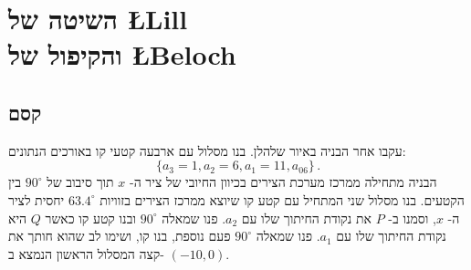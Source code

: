 

\chapter[השיטה של
\L{Lill}
והקיפול של
\L{Beloch}]%
{השיטה של
\L{Lill}\\
והקיפול של
\L{Beloch}%
}\label{c.origami-cube}

\section{קסם}\label{s.magic}

עקבו אחר הבניה באיור שלהלן.
בנו מסלול עם ארבעה קטעי קו באורכים הנתונים:
\[
\{a_3=1,a_2=6,a_1=11,a_06\}\,.
\]
הבניה מתחילה ממרכז מערכת הצירים בכיוון החיובי של ציר ה-%
$x$
תוך סיבוב של
$90^\circ$
בין הקטעים. בנו מסלול שני המתחיל עם קטע קו שיוצא ממרכז הצירים בזוויות
$63.4^\circ$
יחסית לציר ה-%
$x$,
וסמנו ב-%
$P$ 
את נקודת החיתוך שלו עם
$a_2$.
פנו שמאלה 
$90^\circ$
ובנו קטע קו כאשר
$Q$
היא נקודת החיתוך שלו עם
$a_1$.
פנו שמאלה 
$90^\circ$
פעם נוספת, בנו קו, ושימו לב שהוא חותך את קצה המסלול הראשון הנמצא ב-%
$(-10,0)$.


